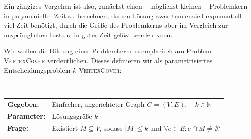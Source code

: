\documentclass[a4paper,ngerman]{atseminar}
\newcommand{\N}{\ensuremath{\mathbb{N}}\xspace}
\begin{document}
\noindent
Ein gängiges Vorgehen ist also, zunächst einen -- möglichst kleinen -- Problemkern in polynomieller Zeit zu berechnen, dessen Lösung zwar tendenziell exponentiell viel Zeit benötigt,
durch die Größe des Problemkerns aber im Vergleich zur ursprünglichen Instanz in guter Zeit gelöst werden kann.

\noindent
Wir wollen die Bildung eines Problemkerns exemplarisch am Problem \textsc{VertexCover} verdeutlichen. Dieses definieren wir als
parametrisiertes Entscheidungsproblem $k$-\textsc{VertexCover}:

\begin{definition}
  $ $\newline
  \begin{tabular}{ll}
    \textbf{Gegeben:} & Einfacher, ungerichteter Graph  $G = (V, E), \quad k \in \N$ \\
    \textbf{Parameter:} & Lösungsgröße $k$ \\
    \textbf{Frage:} & Existiert $M \subseteq V$, sodass $ |M| \leq k $ und $ \forall e \in E : e \cap M \neq \emptyset$?
  \end{tabular}
\end{definition}
\end{document}
